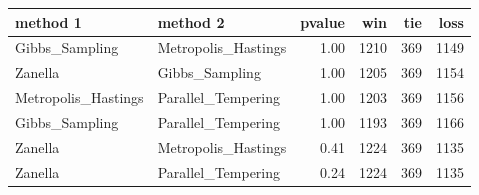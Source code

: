 \begin{table}[ht]
\centering
\begin{tabular}{llrrrr}
  \hline
method 1 & method 2 & pvalue & win & tie & loss \\ 
  \hline
Gibbs\_Sampling & Metropolis\_Hastings & 1.00 & 1210 & 369 & 1149 \\ 
  Zanella & Gibbs\_Sampling & 1.00 & 1205 & 369 & 1154 \\ 
  Metropolis\_Hastings & Parallel\_Tempering & 1.00 & 1203 & 369 & 1156 \\ 
  Gibbs\_Sampling & Parallel\_Tempering & 1.00 & 1193 & 369 & 1166 \\ 
  Zanella & Metropolis\_Hastings & 0.41 & 1224 & 369 & 1135 \\ 
  Zanella & Parallel\_Tempering & 0.24 & 1224 & 369 & 1135 \\ 
   \hline
\end{tabular}
\end{table}
